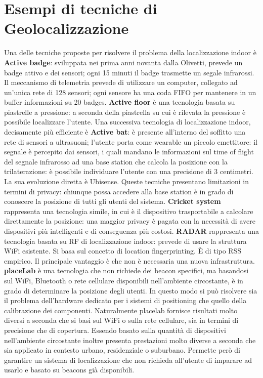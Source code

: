 \section{Esempi di tecniche di Geolocalizzazione}
Una delle tecniche proposte per risolvere il problema della localizzazione
indoor è \textbf{Active badge}: sviluppata nei prima anni novanta dalla
Olivetti, prevede un badge attivo e dei sensori; ogni 15 minuti il badge
trasmette un segale infrarossi. Il meccanismo di telemetria prevede di
utilizzare
un computer, collegato ad un'unica rete di 128 sensori; ogni sensore ha una coda
FIFO per mantenere in un buffer informazioni su 20 badges.
\bigbreak
\textbf{Active floor} è una tecnologia basata su piastrelle a pressione: a
seconda della piastrella su cui è rilevata la pressione è possibile localizzare
l'utente.
\bigbreak
Una successiva tecnologia di localizzazione indoor, decisamente più efficiente è
\textbf{Active bat}: è presente all'interno del soffitto una rete di sensori a
ultrasuoni; l'utente porta come wearable un piccolo emettitore: il segnale è
percepito dai sensori, i quali mandano le informazioni sul time of flight del
segnale infrarosso ad una base station che calcola la posizione con la
trilaterazione: è possibile individuare l'utente con una precisione di 3
centimetri.
La sua evoluzione diretta è Ubisense.
\bigbreak
Queste tecniche presentano limitazioni in termini di privacy: chiunque possa
accedere alla base station è in grado di conoscere la posizione di tutti gli
utenti del sistema. \textbf{Cricket system} rappresenta una tecnologia simile,
in cui è il dispositivo trasportabile a calcolare direttamente la posizione: una
maggior privacy è pagata con la necessità di avere dispositivi più intelligenti
e di conseguenza più costosi.
\bigbreak
\textbf{RADAR} rappresenta una tecnologia basata su RF di localizzazione indoor:
prevede di usare la struttura WiFi esistente. Si basa sul concetto di location
fingerprinting. È di tipo RSS empirico. Il principale vantaggio è che non è
necessaria una nuova infrastruttura.
\bigbreak
\textbf{placeLab} è una tecnologia che non richiede dei beacon specifici, ma
basandosi sul WiFi, Bluetooth o rete cellulare disponibili nell'ambiente
circostante, è in grado di determinare la posizione degli utenti. In questo modo
si può risolvere sia il problema dell'hardware dedicato per i sistemi di
positioning che quello della calibrazione dei componenti.
Naturalmente placelab fornisce risultati molto diversi a seconda che si basi sul
WiFi o sulla rete cellulare, sia in termini di precisione che di copertura.
Essendo basato sulla quantità di dispositivi nell'ambiente circostante inoltre
presenta prestazioni molto diverse a seconda che sia applicato in contesto
urbano, residenziale o suburbano.
Permette però di garantire un sistema di localizzazione che non richieda
all'utente di imparare ad usarlo e basato su beacons già disponibili.

